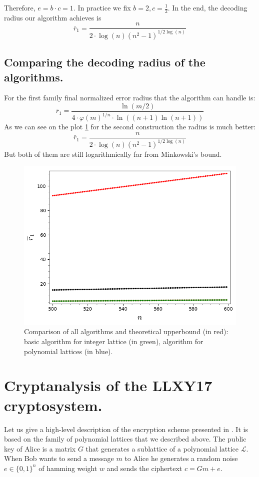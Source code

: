 \documentclass[12pt]{article}
\newcommand{\LL}{\mathcal{L}}
\begin{document}
Therefore, $e = b \cdot c = 1$. In practice we fix $b = 2, c = \frac{1}{2}$. In the end, the decoding radius our algorithm achieves is
\[
    \bar{r}_1 = \frac{n}{2 \cdot \log(n)(n^{2} - 1)^{1/2\log(n)}}
\]

\subsection{Comparing the decoding radius of the algorithms.}
\label{sec:comparison}

For the first family final normalized error radius that the algorithm can handle is:
\[
    \bar{r}_1 = \frac{\ln(m/2)}{4 \cdot \varphi(m)^{1/n} \cdot \ln((n+1)\ln(n+1))}
\]
As we can see on the plot \ref{fig:everything} for the second construction the radius is much better:
\[
    \bar{r}_1 = \frac{n}{2 \cdot \log(n)(n^{2} - 1)^{1/2\log(n)}}
\]
But both of them are still logarithmically far from Minkowski's bound.

\begin{figure}
  \includegraphics[width=\linewidth]{plot5.png}
  \caption{Comparison of all algorithms and theoretical upperbound (in red): basic algorithm for integer lattice (in green), algorithm for polynomial lattices (in blue).}
  \label{fig:everything}
\end{figure}

\section{Cryptanalysis of the LLXY17 cryptosystem.}
\label{sec:cryptanalysis}

Let us give a high-level description of the encryption scheme presented in \cite{[LLXY17]}. It is based on the family of polynomial lattices that we described above. The public key of Alice is a matrix $G$ that generates a sublattice of a polynomial lattice $\LL$. When Bob wants to send a message $m$ to Alice he generates a random noise $ e \in \{0,1\}^{n}$ of hamming weight $w$ and sends the ciphertext $c = Gm + e$.
\end{document}
